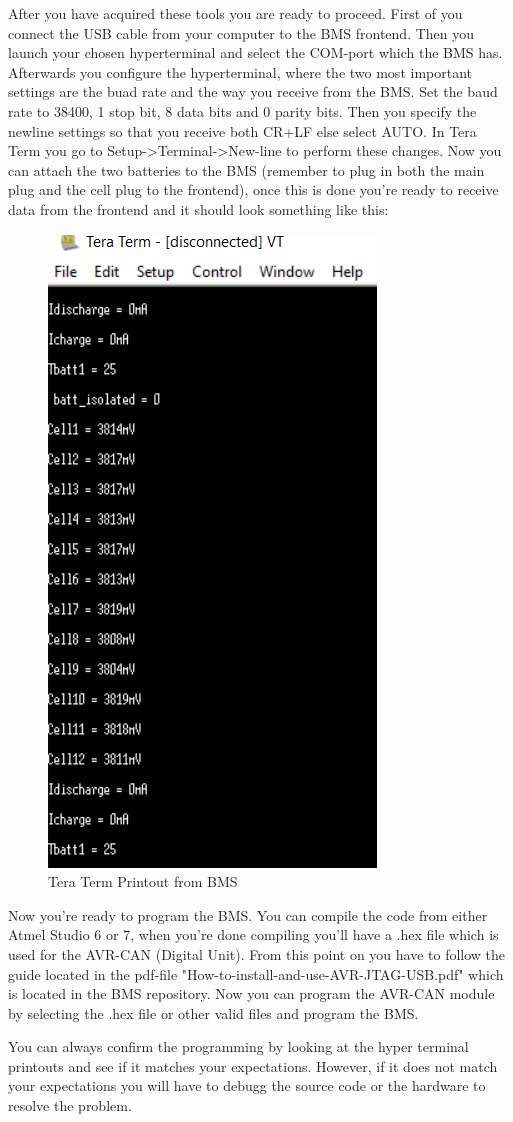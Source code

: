 After you have acquired these tools you are ready to proceed. First of you connect the USB cable from your computer to the BMS frontend. Then you launch your chosen hyperterminal and select the COM-port which the BMS has. Afterwards you configure the hyperterminal, where the two most important settings are the buad rate and the way you receive from the BMS. Set the baud rate to 38400, 1 stop bit, 8 data bits and 0 parity bits. Then you specify the newline settings so that you receive both CR+LF else select AUTO. In Tera Term you go to Setup->Terminal->New-line to perform these changes. 
Now you can attach the two batteries to the BMS (remember to plug in both the main plug and the cell plug to the frontend), once this is done you're ready to receive data from the frontend and it should look something like this: 
\begin{figure}[H]
	\centering
	\includegraphics[width=0.6\linewidth]{Hardware/Pictures/BMS_teraterm}
	\caption{Tera Term Printout from BMS}
	\label{fig:BMSTeraTerm}
\end{figure}

Now you're ready to program the BMS. You can compile the code from either Atmel Studio 6 or 7, when you're done compiling you'll have a .hex file which is used for the AVR-CAN (Digital Unit). From this point on you have to follow the guide located in the pdf-file "How-to-install-and-use-AVR-JTAG-USB.pdf" which is located in the BMS repository. Now you can program the AVR-CAN module by selecting the .hex file or other valid files and program the BMS.

You can always confirm the programming by looking at the hyper terminal printouts and see if it matches your expectations. However, if it does not match your expectations you will have to debugg the source code or the hardware to resolve the problem.

